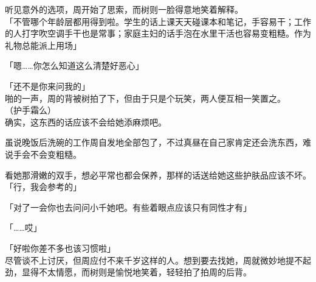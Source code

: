 听见意外的选项，周开始了思索，而树则一脸得意地笑着解释。\\

「不管哪个年龄层都用得到啦。学生的话上课天天碰课本和笔记，手容易干；工作的人打字吹空调手干也是常事；家庭主妇的话手泡在水里干活也容易变粗糙。作为礼物总能派上用场」

「嗯……你怎么知道这么清楚好恶心」

「还不是你来问我的」\\

啪的一声，周的背被树拍了下，但由于只是个玩笑，两人便互相一笑置之。\\

（护手霜么）\\

确实，这东西的话应该不会给她添麻烦吧。

虽说晚饭后洗碗的工作周自发地全部包了，不过真昼在自己家肯定还会洗东西，难说手会不会变粗糙。

看她那滑嫩的双手，想必平常也都会保养，那样的话送给她这些护肤品应该不坏。\\

「行，我会参考的」

「对了一会你也去问问小千她吧。有些着眼点应该只有同性才有」

「……哎」

「好啦你差不多也该习惯啦」\\

尽管谈不上讨厌，但周应付不来千岁这样的人。想到要去找她，周就微妙地提不起劲，显得不太情愿，而树则是愉悦地笑着，轻轻拍了拍周的后背。
